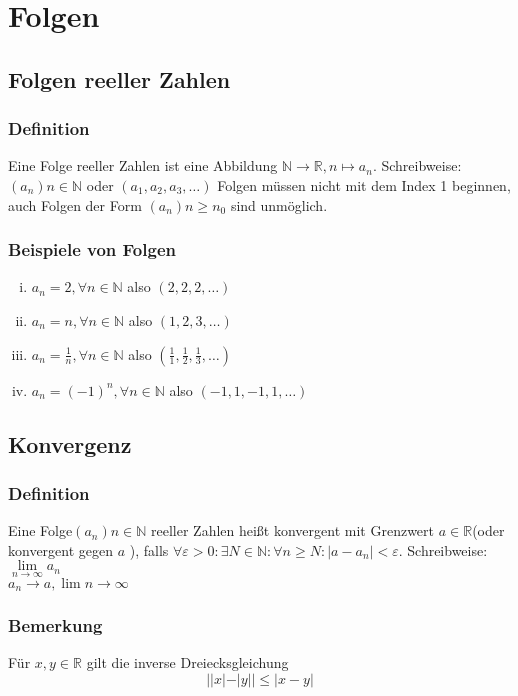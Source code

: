 \documentclass{scrreprt}
\newcommand{\NN}{\mathbb{N}}
\newcommand{\RR}{\mathbb{R}}
\begin{document}
	\chapter{Folgen}
	\section{Folgen reeller Zahlen}
		\subsection{Definition}
		Eine Folge reeller Zahlen ist eine Abbildung $\NN \longrightarrow \RR , n \mapsto a_n $. Schreibweise: $ (a_n ) n \in \NN $ oder $ (a_1 , a_2 ,a_3 , \dots )$
		Folgen müssen nicht mit dem Index 1 beginnen, auch Folgen der Form $(a_n ) n \geq n_0 $ sind unmöglich.
		
		\subsection{Beispiele von Folgen}
		\begin{enumerate}[i)]
			\item $a_n =2 ,\forall n \in \NN$ also $(2,2,2,\dots )$
			\item $a_n = n ,\forall n \in \NN$ also $(1,2,3,\dots )$
			\item $a_n = \frac{1}{n},\forall n \in \NN$ also $(\frac{1}{1},\frac{1}{2},\frac{1}{3}, \dots )$
			\item $a_n =(-1)^n , \forall n \in \NN$ also $(-1,1,-1,1, \dots )$
		\end{enumerate}
	\section{Konvergenz}
		\subsection{Definition}
		Eine Folge$(a_n ) n \in \NN$ reeller Zahlen heißt konvergent mit Grenzwert $a \in \RR$(oder \glqq konvergent gegen $a$ \grqq ), falls $\forall \varepsilon > 0 :\exists N \in \NN :\forall n \geq N:|a-a_n | < \varepsilon$. Schreibweise: $\lim\limits_{n \rightarrow \infty}{a_n}$ \\
		$a_n \longrightarrow a, \lim n \longrightarrow \infty$
		\subsection{Bemerkung}
		Für $x,y \in \RR$ gilt die inverse Dreiecksgleichung
		\begin{equation*}
			||x|-|y|| \leq |x-y|
		\end{equation*}
\end{document}
